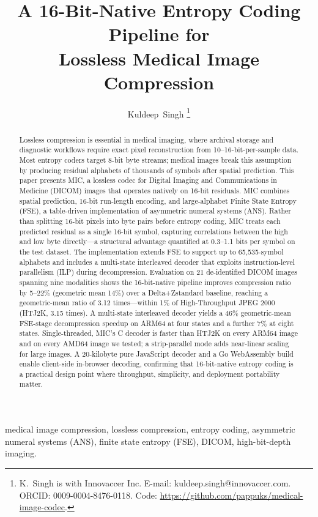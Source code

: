 \documentclass[journal]{IEEEtran}
\title{A 16-Bit-Native Entropy Coding Pipeline for\\
       Lossless Medical Image Compression}
\author{Kuldeep~Singh%
\thanks{K.\ Singh is with Innovaccer Inc.
E-mail: kuldeep.singh@innovaccer.com.
ORCID: 0009-0004-8476-0118.
Code: \url{https://github.com/pappuks/medical-image-codec}.}%
}
\begin{document}
\maketitle

\begin{abstract}
Lossless compression is essential in medical imaging, where archival storage
and diagnostic workflows require exact pixel reconstruction from
10--16-bit-per-sample data. Most entropy coders target 8-bit byte streams;
medical images break this assumption by producing residual alphabets of
thousands of symbols after spatial prediction. This paper presents MIC, a
lossless codec for Digital Imaging and Communications in Medicine (DICOM)
images that operates natively on 16-bit residuals. MIC combines spatial
prediction, 16-bit run-length encoding, and large-alphabet Finite State
Entropy (FSE), a table-driven implementation of asymmetric numeral systems
(ANS). Rather than splitting 16-bit pixels into byte pairs before entropy
coding, MIC treats each predicted residual as a single 16-bit symbol,
capturing correlations between the high and low byte directly---a structural
advantage quantified at 0.3--1.1 bits per symbol on the test dataset. The
implementation extends FSE to support up to 65,535-symbol alphabets and
includes a multi-state interleaved decoder that exploits
instruction-level parallelism (ILP) during decompression. Evaluation on 21
de-identified DICOM images spanning nine modalities shows the 16-bit-native
pipeline improves compression ratio by 5--22\% (geometric mean 14\%) over a
Delta+Zstandard baseline, reaching a geometric-mean ratio of 3.12
times---within 1\% of High-Throughput JPEG 2000 (HTJ2K, 3.15 times). A
multi-state interleaved decoder yields a 46\% geometric-mean FSE-stage
decompression speedup on ARM64 at four states and a further 7\% at
eight states. Single-threaded, MIC's C decoder is faster than HTJ2K on
every ARM64 image and on every AMD64 image we tested; a strip-parallel
mode adds
near-linear scaling for large images. A 20-kilobyte pure JavaScript
decoder and a Go WebAssembly build enable client-side in-browser
decoding, confirming that 16-bit-native entropy coding is a practical design
point where throughput, simplicity, and deployment portability matter.
\end{abstract}

\begin{IEEEkeywords}
medical image compression, lossless compression, entropy coding, asymmetric
numeral systems (ANS), finite state entropy (FSE), DICOM, high-bit-depth
imaging.
\end{IEEEkeywords}
\end{document}
